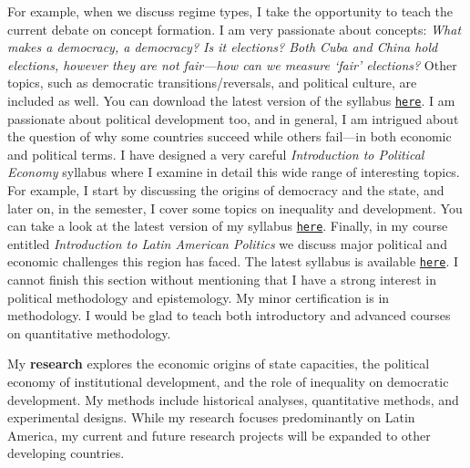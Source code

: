 \documentclass[10pt,stdletter,dateno,sigleft]{newlfm} %
\begin{document}
\begin{newlfm}
For example, when we discuss regime types, I take the opportunity to teach the current debate on concept formation. I am very passionate about concepts: \emph{What makes a democracy, a \emph{democracy}? Is it elections? Both Cuba and China hold elections, however they are not fair---how can we measure `fair' elections?} Other topics, such as democratic transitions/reversals, and political culture, are included as well. You can download the latest version of the syllabus \href{https://github.com/hbahamonde/Comparative_Politics_UGRAD/raw/master/Bahamonde_Comparative_Politics_Syllabus_UGRAD.pdf}{\texttt{here}}. I am passionate about political development too, and in general, I am intrigued about the question of why some countries succeed while others fail---in both economic and political terms. I have designed a very careful \emph{Introduction to Political Economy} syllabus where I examine in detail this wide range of interesting topics. For example, I start by discussing the origins of democracy and the state, and later on, in the semester, I cover some topics on inequality and development. You can take a look at the latest version of my syllabus \href{https://github.com/hbahamonde/Political-Economy-Intro-UGrad/raw/master/Pol_Econ_Dev_Syllabus_UGRAD.pdf}{\texttt{here}}. Finally, in my course entitled \emph{Introduction to Latin American Politics} we discuss major political and economic challenges this region has faced. The latest syllabus is available \href{https://github.com/hbahamonde/Latin_American_Politics_UGRAD/raw/master/Bahamonde_Latin_American_Politics_Syllabus_UGRAD.pdf}{\texttt{here}}. I cannot finish this section without mentioning that I have a strong interest in political methodology and epistemology. My minor certification is in methodology. I would be glad to teach both introductory and advanced courses on quantitative methodology.


My {\bf research} explores the economic origins of state capacities, the political economy of institutional development, and the role of inequality on democratic development. My methods include historical analyses, quantitative methods, and experimental designs. While my research focuses predominantly on Latin America, my current and future research projects will be expanded to other developing countries.


\end{newlfm}
\end{document}
